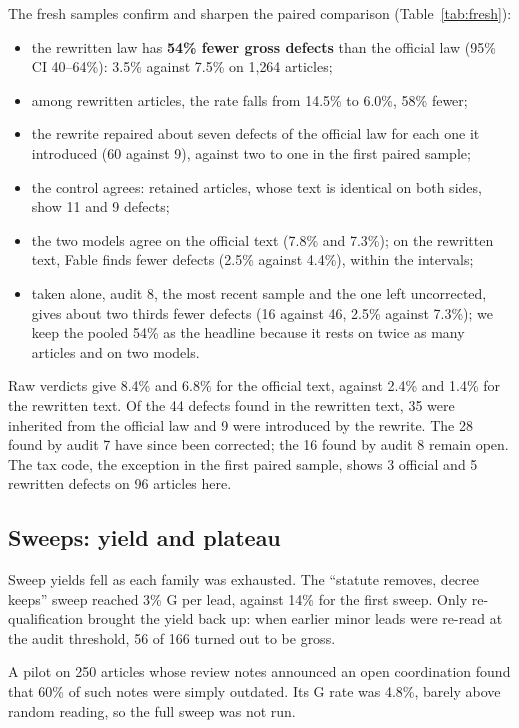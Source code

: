 \documentclass[11pt,a4paper]{article}
\begin{document}
The fresh samples confirm and sharpen the paired comparison (Table~\ref{tab:fresh}):
\begin{itemize}
  \item the rewritten law has \textbf{54\% fewer gross defects} than the official law (95\% CI 40--64\%): 3.5\% against 7.5\% on 1{,}264 articles;
  \item among rewritten articles, the rate falls from 14.5\% to 6.0\%, 58\% fewer;
  \item the rewrite repaired about seven defects of the official law for each one it introduced (60 against 9), against two to one in the first paired sample;
  \item the control agrees: retained articles, whose text is identical on both sides, show 11 and 9 defects;
  \item the two models agree on the official text (7.8\% and 7.3\%); on the rewritten text, Fable finds fewer defects (2.5\% against 4.4\%), within the intervals;
  \item taken alone, audit 8, the most recent sample and the one left uncorrected, gives about two thirds fewer defects (16 against 46, 2.5\% against 7.3\%); we keep the pooled 54\% as the headline because it rests on twice as many articles and on two models.
\end{itemize}
Raw verdicts give 8.4\% and 6.8\% for the official text, against 2.4\% and 1.4\% for the rewritten text. Of the 44 defects found in the rewritten text, 35 were inherited from the official law and 9 were introduced by the rewrite. The 28 found by audit 7 have since been corrected; the 16 found by audit 8 remain open. The tax code, the exception in the first paired sample, shows 3 official and 5 rewritten defects on 96 articles here.

\subsection{Sweeps: yield and plateau}

Sweep yields fell as each family was exhausted. The ``statute removes, decree keeps'' sweep reached 3\% G per lead, against 14\% for the first sweep. Only re-qualification brought the yield back up: when earlier minor leads were re-read at the audit threshold, 56 of 166 turned out to be gross.

A pilot on 250 articles whose review notes announced an open coordination found that 60\% of such notes were simply outdated. Its G rate was 4.8\%, barely above random reading, so the full sweep was not run.
\end{document}
